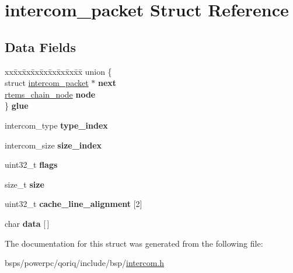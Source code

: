 \hypertarget{structintercom__packet}{}\section{intercom\+\_\+packet Struct Reference}
\label{structintercom__packet}
\subsection*{Data Fields}
\begin{DoxyCompactItemize}
\item 
\mbox{\label{structintercom__packet_af315eaf79cafbbf51ab839bda1ce9a2d}} 
\begin{tabbing}
xx\=xx\=xx\=xx\=xx\=xx\=xx\=xx\=xx\=\kill
union \{\\
\>struct \mbox{\hyperlink{structintercom__packet}{intercom\_packet}} $\ast$ {\bfseries next}\\
\>\mbox{\hyperlink{structChain__Node__struct}{rtems\_chain\_node}} {\bfseries node}\\
\} {\bfseries glue}\\

\end{tabbing}\item 
\mbox{\label{structintercom__packet_a10704c45f54a6f41a69a55f826ad7664}} 
intercom\+\_\+type {\bfseries type\+\_\+index}
\item 
\mbox{\label{structintercom__packet_a215dfe33b5cbbf966781367aa1f1deab}} 
intercom\+\_\+size {\bfseries size\+\_\+index}
\item 
\mbox{\label{structintercom__packet_a658fe7afa0fd0e919a1f9a1dac3f97a0}} 
uint32\+\_\+t {\bfseries flags}
\item 
\mbox{\label{structintercom__packet_aead2a895bcd7cb61a3194243210c25ea}} 
size\+\_\+t {\bfseries size}
\item 
\mbox{\label{structintercom__packet_a40d28571e7f661cd36ef23b1880ac042}} 
uint32\+\_\+t {\bfseries cache\+\_\+line\+\_\+alignment} \mbox{[}2\mbox{]}
\item 
\mbox{\label{structintercom__packet_ada411189166ecdde008d7024225038b6}} 
char {\bfseries data} \mbox{[}$\,$\mbox{]}
\end{DoxyCompactItemize}


The documentation for this struct was generated from the following file\+:\begin{DoxyCompactItemize}
\item 
bsps/powerpc/qoriq/include/bsp/\mbox{\hyperlink{intercom_8h}{intercom.\+h}}\end{DoxyCompactItemize}
